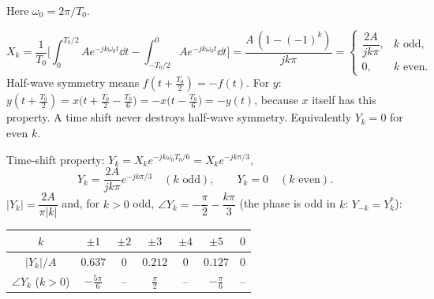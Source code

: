 \begin{solution}
Here $\omega_0=2\pi/T_0$.

\[
X_k=\frac1{T_0}\Big[\int_0^{T_0/2}Ae^{-jk\omega_0t}\dd t-\int_{-T_0/2}^{0}Ae^{-jk\omega_0t}\dd t\Big]=\frac{A\,(1-(-1)^k)}{jk\pi}
=\begin{cases}\dfrac{2A}{jk\pi},&k\text{ odd},\\0,&k\text{ even}.\end{cases}
\]
 Half-wave symmetry means $f(t+\frac{T_0}2)=-f(t)$. For $y$: $y(t+\frac{T_0}2)=x\big(t+\frac{T_0}2-\frac{T_0}6\big)=-x\big(t-\frac{T_0}6\big)=-y(t)$, because $x$ itself has this property. A time shift never destroys half-wave symmetry. Equivalently $Y_k=0$ for even $k$.

 Time-shift property: $Y_k=X_ke^{-jk\omega_0T_0/6}=X_ke^{-jk\pi/3}$,
\[Y_k=\frac{2A}{jk\pi}e^{-jk\pi/3}\quad(k\text{ odd}),\qquad Y_k=0\quad(k\text{ even}).\]
 $|Y_k|=\dfrac{2A}{\pi|k|}$ and, for $k>0$ odd, $\angle Y_k=-\dfrac\pi2-\dfrac{k\pi}3$ (the phase is odd in $k$: $Y_{-k}=Y_k^*$):
\begin{center}\small\begin{tabular}{@{}c|cccccc@{}}$k$&$\pm1$&$\pm2$&$\pm3$&$\pm4$&$\pm5$&$0$\\\hline$|Y_k|/A$&$0.637$&$0$&$0.212$&$0$&$0.127$&$0$\\$\angle Y_k$ ($k>0$)&$-\frac{5\pi}{6}$&--&$\frac\pi2$&--&$-\frac\pi6$&--\end{tabular}\end{center}
\begin{center}
\hspace{2mm}

\end{center}
\end{solution}
